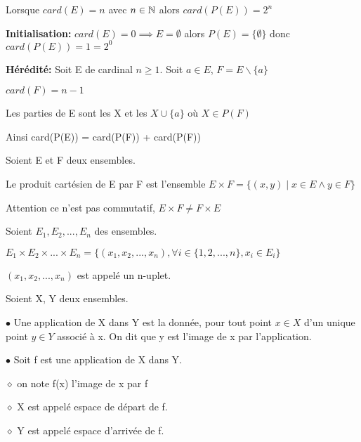 \documentclass[a4paper, 12pt]{article}
\begin{document}
\begin{theorem}
    Lorsque $card(E) = n$ avec $n \in \mathbb{N}$ alors $card(P(E)) = 2^n$
\end{theorem}

\begin{demonstration}
\textbf{Initialisation:} $card(E) = 0 \implies E = \emptyset$ alors $P(E) = \{\emptyset\}$ donc $card(P(E)) = 1 = 2^0$ 

\textbf{Hérédité:} Soit E de cardinal $n \geq 1$. Soit $a \in E$, $F = E\backslash \{a\}$

$card(F) = n - 1$

Les parties de E sont les X et les $X \cup \{a\}$ où $X \in P(F)$

Ainsi card(P(E)) = card(P(F)) + card(P(F))
\end{demonstration}

\begin{definition}
    Soient E et F deux ensembles.

    Le produit cartésien de E par F est l'ensemble $E \times F = \{(x, y) \mid x \in E \land y \in F\}$
\end{definition}

\begin{remark}
    Attention ce n'est pas commutatif, $E \times F \neq F \times E$
\end{remark}

\begin{definition}
    Soient $E_1, E_2, ..., E_n$ des ensembles.

    $E_1 \times E_2 \times ... \times E_n = \{(x_1, x_2, ..., x_n), \forall i \in \{1, 2, ..., n\}, x_i \in E_i\}$

    $(x_1, x_2, ..., x_n)$ est appelé un n-uplet.
\end{definition}




\begin{definition}
    Soient X, Y deux ensembles.

    \item $\bullet$ Une application de X dans Y est la donnée, pour tout point
    $x \in X$ d'un unique point $y \in Y$ associé à x.
    On dit que y est l'image de x par l'application.

    \item $\bullet$ Soit f est une application de X dans Y.
    \item $\diamond$ on note f(x) l'image de x par f
    \item $\diamond$ X est appelé espace de départ de f.
    \item $\diamond$ Y est appelé espace d'arrivée de f.
    \item %
\end{definition}
\end{document}

